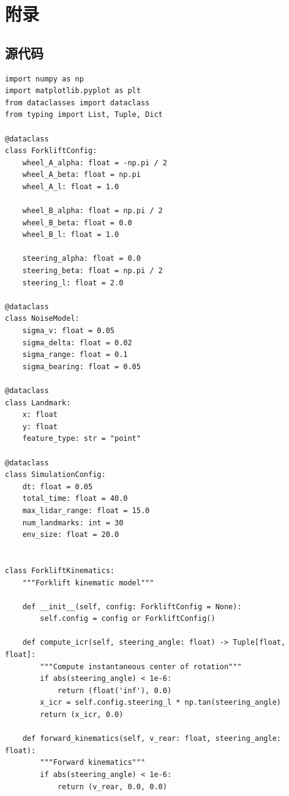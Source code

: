 \documentclass[12pt,a4paper]{report}
\begin{document}
\appendix

\chapter{附录}

\section{源代码}

\begin{lstlisting}[caption={Complete Simulation System (complete\_simulation.py)}]
import numpy as np
import matplotlib.pyplot as plt
from dataclasses import dataclass
from typing import List, Tuple, Dict

@dataclass
class ForkliftConfig:
    wheel_A_alpha: float = -np.pi / 2
    wheel_A_beta: float = np.pi
    wheel_A_l: float = 1.0
    
    wheel_B_alpha: float = np.pi / 2
    wheel_B_beta: float = 0.0
    wheel_B_l: float = 1.0
    
    steering_alpha: float = 0.0
    steering_beta: float = np.pi / 2
    steering_l: float = 2.0

@dataclass
class NoiseModel:
    sigma_v: float = 0.05
    sigma_delta: float = 0.02
    sigma_range: float = 0.1
    sigma_bearing: float = 0.05

@dataclass
class Landmark:
    x: float
    y: float
    feature_type: str = "point"

@dataclass
class SimulationConfig:
    dt: float = 0.05
    total_time: float = 40.0
    max_lidar_range: float = 15.0
    num_landmarks: int = 30
    env_size: float = 20.0


class ForkliftKinematics:
    """Forklift kinematic model"""
    
    def __init__(self, config: ForkliftConfig = None):
        self.config = config or ForkliftConfig()
        
    def compute_icr(self, steering_angle: float) -> Tuple[float, float]:
        """Compute instantaneous center of rotation"""
        if abs(steering_angle) < 1e-6:
            return (float('inf'), 0.0)
        x_icr = self.config.steering_l * np.tan(steering_angle)
        return (x_icr, 0.0)
    
    def forward_kinematics(self, v_rear: float, steering_angle: float):
        """Forward kinematics"""
        if abs(steering_angle) < 1e-6:
            return (v_rear, 0.0, 0.0)
        

\end{lstlisting}
\end{document}

